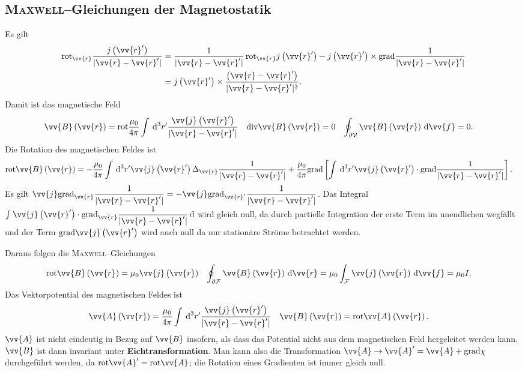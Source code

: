 \documentclass[a4paper,12pt]{article}
\newcommand{\td}{\,\text{d}}
\numberwithin{equation}{section}
\begin{document}
\subsection{\textsc{Maxwell}--Gleichungen der Magnetostatik}
Es gilt
\begin{align} 
        \,\text{rot}_{\vv{r}}\dfrac{j\left(\vv{r}'\right)}{|\vv{r}-\vv{r}'|}&=\dfrac{1}{|\vv{r}-\vv{r}'|}\,\text{rot}_{\vv{r}}j\left(\vv{r}'\right)-j\left(\vv{r}'\right)\times \text{grad}\dfrac{1}{|\vv{r}-\vv{r}'|}\\
                                                                            &=j\left(\vv{r}'\right)\times \dfrac{\left(\vv{r}-\vv{r}'\right)}{|\vv{r}-\vv{r}'|^3}
.\end{align} 
Damit ist das magnetische Feld
\begin{align} 
        \vv{B}\left(\vv{r}\right)&=\text{rot}\dfrac{\mu _0}{4\pi }\int_{}^{}\td ^3r'\dfrac{\vv{j}\left(\vv{r}'\right)}{|\vv{r}-\vv{r}'|}&\text{div}\vv{B}\left(\vv{r}\right)&=0&\oint_{\partial \mathcal{V}}^{}\vv{B}\left(\vv{r}\right)\td \vv{f}&=0
.\end{align} 
Die Rotation des magnetischen Feldes ist
\begin{align} 
        \text{rot}\vv{B}\left(\vv{r}\right)&=-\dfrac{\mu _0}{4\pi }\int_{}^{}\td ^3r'\vv{j}\left(\vv{r}'\right)\Delta _{\vv{r}}\dfrac{1}{|\vv{r}-\vv{r}'|}+\dfrac{\mu _0}{4\pi }\text{grad}\left[\int_{}^{}\td ^3r'\vv{j}\left(\vv{r}'\right)\cdot \text{grad}\dfrac{1}{|\vv{r}-\vv{r}'|}\right]
.\end{align} 
Es gilt $\vv{j}\text{grad}_{\vv{r}}\dfrac{1}{|\vv{r}-\vv{r}'|}=-\vv{j}\text{grad}_{\vv{r}'}\dfrac{1}{|\vv{r}-\vv{r}'|}$. Das Integral $\int_{}^{}\vv{j}\left(\vv{r}'\right)\cdot \text{grad}_{\vv{r}}\dfrac{1}{|\vv{r}-\vv{r}'|}\td $ wird gleich null, da durch partielle Integration der erste Term im unendlichen wegfällt und der Term $\text{grad}\vv{j}\left(\vv{r}'\right)$ wird auch null da nur stationäre Ströme betrachtet werden.\par
Daraus folgen die \textsc{Maxwell}--Gleichungen
\begin{align} 
        \text{rot}\vv{B}\left(\vv{r}\right)&=\mu _0\vv{j}\left(\vv{r}\right)&\oint_{\partial \mathcal{F}}^{}\vv{B}\left(\vv{r}\right)\td \vv{r}&=\mu _0\int_{\mathcal{F}}^{}\vv{j}\left(\vv{r}\right)\td \vv{f}=\mu _0I
.\end{align} 
Das Vektorpotential des magnetischen Feldes ist
\begin{align} 
        \vv{A}\left(\vv{r}\right)&=\dfrac{\mu _0}{4\pi }\int_{}^{}\td ^3r'\dfrac{\vv{j}\left(\vv{r}'\right)}{|\vv{r}-\vv{r}'|}&\vv{B}\left(\vv{r}\right)&=\text{rot}\vv{A}\left(\vv{r}\right)
.\end{align} 
$\vv{A}$ ist nicht eindeutig in Bezug auf $\vv{B}$ insofern, als dass das Potential nicht aus dem magnetischen Feld hergeleitet werden kann.
$\vv{B}$ ist dann invariant unter \textbf{Eichtransformation}.
Man kann also die Transformation $\vv{A}\rightarrow \vv{A}'=\vv{A}+\text{grad}\chi$ durchgeführt werden, da $\text{rot}\vv{A}'=\text{rot}\vv{A}$; die Rotation eines Gradienten ist immer gleich null.
\end{document}
